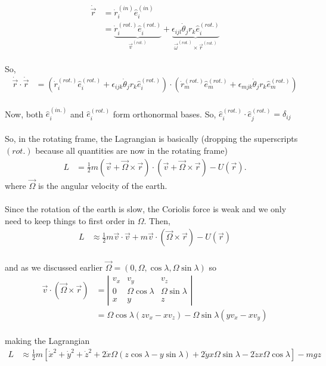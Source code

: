 \documentclass[11pt]{article}
\begin{document}
\begin{align*}
  \dot{\vec{r}} &= \dot{r}_i^{(in)} \hat{e}_i^{(in)} \\
  &= \underbrace{\dot{r}_i^{(rot.)} \hat{e}_i^{(rot.)}}_{\vec{v}^{(rot.)}} + \underbrace{\epsilon_{ijl} \dot{\theta}_{j} r_{k} \hat{e}_i^{(rot.)}}_{ \vec{\omega}^{(rot.)} \times \vec{r}^{(rot.)} }
\end{align*}
\\
So,
\begin{align*}
  \dot{\vec{r}} \cdot \dot{\vec{r}} &= \left( \dot{r}_i^{(rot.)} \hat{e}_i^{(rot.)} + \epsilon_{ijk} \dot{\theta}_{j} r_{k} \hat{e}_i^{(rot.)} \right) \cdot \left( \dot{r}_m^{(rot.)} \hat{e}_m^{(rot.)} + \epsilon_{mjk} \dot{\theta}_{j} r_{k} \hat{e}_m^{(rot.)} \right)
\end{align*}
\\
Now, both $\hat{e}_i^{(in.)}$ and $\hat{e}_i^{(rot.)}$ form orthonormal bases. So, $\hat{e}_i^{(rot.)} \cdot \hat{e}_j^{(rot.)} = \delta_{ij}$
\\
\\
So, in the rotating frame, the Lagrangian is basically (dropping the superscripts $(rot.)$ because all quantities are now in the rotating frame)
\begin{align*}
  L &= \frac{1}{2}m \left(\vec{v} + \vec{\Omega} \times \vec{r}\right) \cdot  \left(\vec{v} + \vec{\Omega} \times \vec{r}\right) - U(\vec{r}).
\end{align*}
where $\vec{\Omega}$ is the angular velocity of the earth.
\\
\\
Since the rotation of the earth is slow, the Coriolis force is weak and we only need to keep things to first order in $\Omega$. Then,
\begin{align*}
  L &\approx \frac{1}{2}m \vec{v} \cdot \vec{v} + m \vec{v} \cdot \left(\vec{\Omega} \times \vec{r}\right) - U(\vec{r})
\end{align*}
\\
and as we discussed earlier $\vec{\Omega} = \left(0, \Omega, \cos\lambda, \Omega\sin\lambda\right)$ so
\\
\begin{align*}
  \vec{v} \cdot \left(\vec{\Omega} \times \vec{r} \right) &= \left| \begin{matrix}
    v_x & v_y & v_z \\
    0 & \Omega\cos\lambda & \Omega\sin\lambda \\
    x & y & z
  \end{matrix} \right| \\
  &= \Omega\cos\lambda\left(zv_x - xv_z\right) - \Omega\sin\lambda \left(yv_x - xv_y\right)
\end{align*}
\\
making the Lagrangian
\begin{align*}
  L &\approx \frac{1}{2}m \left[ \dot{x}^2 + \dot{y}^2 + \dot{z}^2 + 2\dot{x} \Omega \left( z \cos\lambda - y\sin\lambda\right) + 2\dot{y}x\Omega\sin\lambda - 2\dot{z}x\Omega\cos\lambda\right] - mgz
\end{align*}
\end{document}
